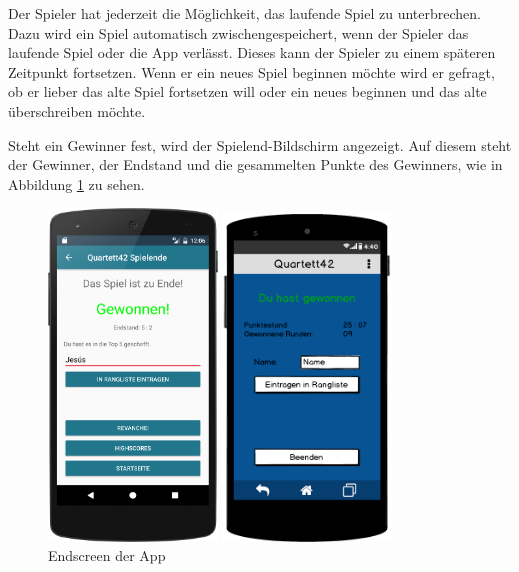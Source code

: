 Der Spieler hat jederzeit die Möglichkeit, das laufende Spiel zu unterbrechen. Dazu wird ein Spiel automatisch zwischengespeichert, wenn der Spieler das laufende Spiel oder die App verlässt. Dieses kann der Spieler zu einem späteren Zeitpunkt fortsetzen. Wenn er ein neues Spiel beginnen möchte wird er gefragt, ob er lieber das alte Spiel fortsetzen will oder ein neues beginnen und das alte überschreiben möchte.

Steht ein Gewinner fest, wird der Spielend-Bildschirm angezeigt. Auf diesem steht der Gewinner, der Endstand und die gesammelten Punkte des Gewinners, wie in Abbildung \ref{figure:implementierungspielende} zu sehen.\\

\begin{figure}[h]
    \centering
    \begin{minipage}{0.49\textwidth}
        \centering
        \includegraphics[width=0.4\textwidth]{img/screenshots/device_game_end.png}
		\caption{Endscreen der App}
		\label{figure:implementierungspielende}   
	\end{minipage}
    \begin{minipage}{0.49\textwidth}
        \centering
        \includegraphics[width=0.4\textwidth]{img/mockups/spiel_ende.png}

\end{minipage}
\end{figure}
